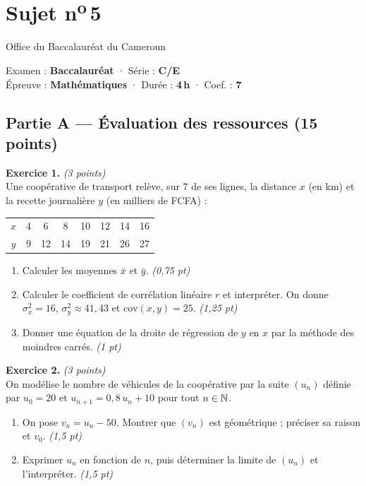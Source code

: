 \section{Sujet n\textsuperscript{o}\,5}
\noindent\begin{minipage}{0.5\linewidth}\footnotesize Office du Baccalauréat du Cameroun\end{minipage}%
\hfill\begin{minipage}{0.45\linewidth}\footnotesize\raggedleft Examen : \textbf{Baccalauréat} · Série : \textbf{C/E}\\
Épreuve : \textbf{Mathématiques} · Durée : \textbf{4\,h} · Coef. : \textbf{7}\end{minipage}
\par\smallskip{\color{onbo}\rule{\linewidth}{1pt}}

\subsection*{Partie A — Évaluation des ressources \hfill (15 points)}

\noindent\textbf{Exercice 1.} \hfill\textit{(3 points)}\\
Une coopérative de transport relève, sur $7$ de ses lignes, la distance $x$ (en \si{\kilo\metre})
et la recette journalière $y$ (en milliers de FCFA) :
\begin{center}\small
\begin{tabular}{c|ccccccc}
\toprule
$x$ & 4 & 6 & 8 & 10 & 12 & 14 & 16\\
$y$ & 9 & 12 & 14 & 19 & 21 & 26 & 27\\
\bottomrule
\end{tabular}
\end{center}
\begin{enumerate}[label=\arabic*)]
\item Calculer les moyennes $\bar x$ et $\bar y$. \hfill\textit{(0,75 pt)}
\item Calculer le coefficient de corrélation linéaire $r$ et interpréter. On donne
$\sigma_x^2=16$, $\sigma_y^2\approx41{,}43$ et $\mathrm{cov}(x,y)=25$. \hfill\textit{(1,25 pt)}
\item Donner une équation de la droite de régression de $y$ en $x$ par la méthode des moindres carrés. \hfill\textit{(1 pt)}
\end{enumerate}

\smallskip
\noindent\textbf{Exercice 2.} \hfill\textit{(3 points)}\\
On modélise le nombre de véhicules de la coopérative par la suite $(u_n)$ définie par
$u_0=20$ et $u_{n+1}=0{,}8\,u_n+10$ pour tout $n\in\mathbb{N}$.
\begin{enumerate}[label=\arabic*)]
\item On pose $v_n=u_n-50$. Montrer que $(v_n)$ est géométrique ; préciser sa raison et $v_0$. \hfill\textit{(1,5 pt)}
\item Exprimer $u_n$ en fonction de $n$, puis déterminer la limite de $(u_n)$ et l'interpréter. \hfill\textit{(1,5 pt)}
\end{enumerate}

